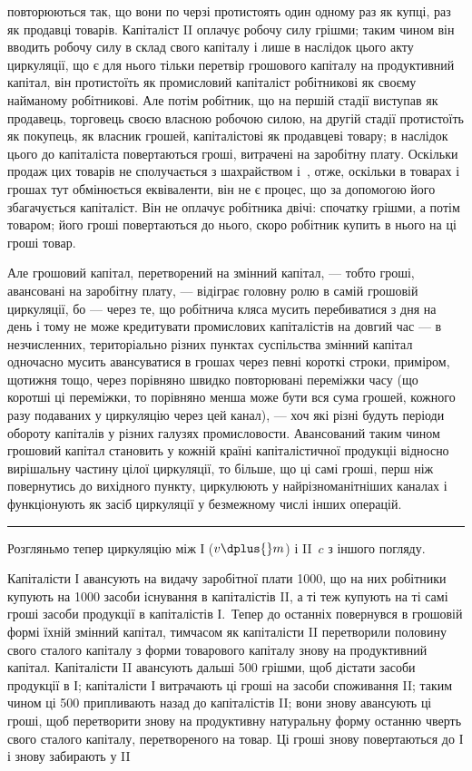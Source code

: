 \parcont{}  %
повторюються так, що вони по черзі протистоять один одному раз як
купці, раз як продавці товарів. Капіталіст II оплачує робочу силу грішми;
таким чином він вводить робочу силу в склад свого капіталу і лише
в наслідок цього акту циркуляції, що є для нього тільки перетвір грошового
капіталу на продуктивний капітал, він протистоїть як промисловий
капіталіст робітникові як своєму найманому робітникові. Але
потім робітник, що на першій стадії виступав як продавець, торговець
своєю власною робочою силою, на другій стадії протистоїть як покупець,
як власник грошей, капіталістові як продавцеві товару; в наслідок цього
до капіталіста повертаються гроші, витрачені на заробітну плату. Оскільки
продаж цих товарів не сполучається з шахрайством і~, отже,
оскільки в товарах і грошах тут обмінюється еквіваленти, він не є процес,
що за допомогою його збагачується капіталіст. Він не оплачує
робітника двічі: спочатку грішми, а потім товаром; його гроші повертаються
до нього, скоро робітник купить в нього на ці гроші товар.

Але грошовий капітал, перетворений на змінний капітал, — тобто гроші,
авансовані на заробітну плату, — відіграє головну ролю в самій грошовій
циркуляції, бо — через те, що робітнича кляса мусить перебиватися з
дня на день і тому не може кредитувати промислових капіталістів на
довгий час — в незчисленних, територіально різних пунктах суспільства
змінний капітал одночасно мусить авансуватися в грошах через певні
короткі строки, приміром, щотижня тощо, через порівняно швидко
повторювані переміжки часу (що коротші ці переміжки, то порівняно
менша може бути вся сума грошей, кожного разу подаваних у
циркуляцію через цей канал), — хоч які різні будуть періоди обороту
капіталів у різних галузях промисловости. Авансований таким чином грошовий
капітал становить у кожній країні капіталістичної продукціі відносно
вирішальну частину цілої циркуляції, то більше, що ці самі гроші,
перш ніж повернутись до вихідного пункту, циркулюють у найрізноманітніших
каналах і функціонують як засіб циркуляції у безмежному числі
інших операцій.
\pfbreak
Розгляньмо тепер циркуляцію між І ($v \dplus{} m$) і II~$c$ з іншого погляду.

\vtyagnut{}
Капіталісти І авансують на видачу заробітної плати 1000,
що на них робітники купують на 1000 засоби існування в капіталістів
II, а ті теж купують на ті самі гроші засоби продукції в капіталістів
І.~Тепер до останніх повернувся в грошовій формі їхній змінний
капітал, тимчасом як капіталісти II перетворили половину свого сталого
капіталу з форми товарового капіталу знову на продуктивний капітал.
Капіталісти II авансують дальші 500 грішми, щоб дістати засоби
продукції в І; капіталісти І витрачають ці гроші на засоби споживання
II; таким чином ці 500 припливають назад до капіталістів II;
вони знову авансують ці гроші, щоб перетворити знову на продуктивну
натуральну форму останню чверть свого сталого капіталу, перетвореного
на товар. Ці гроші знову повертаються до І і знову забирають у II
\parbreak{}  %
